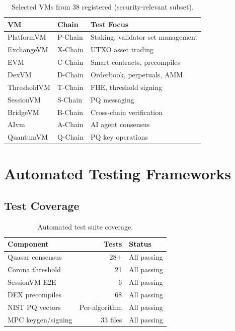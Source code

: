 \documentclass[11pt,letterpaper]{article}
\begin{document}
\begin{table}[H]
\centering
\small
\begin{tabular}{@{}llp{4cm}@{}}
\toprule
\textbf{VM} & \textbf{Chain} & \textbf{Test Focus} \\
\midrule
PlatformVM & P-Chain & Staking, validator set management \\
ExchangeVM & X-Chain & UTXO asset trading \\
EVM & C-Chain & Smart contracts, precompiles \\
DexVM & D-Chain & Orderbook, perpetuals, AMM \\
ThresholdVM & T-Chain & FHE, threshold signing \\
SessionVM & S-Chain & PQ messaging \\
BridgeVM & B-Chain & Cross-chain verification \\
AIvm & A-Chain & AI agent consensus \\
QuantumVM & Q-Chain & PQ key operations \\
\bottomrule
\end{tabular}
\caption{Selected VMs from 38 registered (security-relevant subset).}
\label{tab:vms}
\end{table}

\section{Automated Testing Frameworks}

\subsection{Test Coverage}

\begin{table}[H]
\centering
\begin{tabular}{@{}lrl@{}}
\toprule
\textbf{Component} & \textbf{Tests} & \textbf{Status} \\
\midrule
Quasar consensus & 28+ & All passing \\
Corona threshold & 21 & All passing \\
SessionVM E2E & 6 & All passing \\
DEX precompiles & 68 & All passing \\
NIST PQ vectors & Per-algorithm & All passing \\
MPC keygen/signing & 33 files & All passing \\
\bottomrule
\end{tabular}
\caption{Automated test suite coverage.}
\label{tab:test-coverage}
\end{table}
\end{document}
